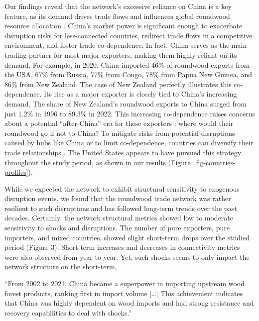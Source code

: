 \documentclass[
  authoryear,
  review,
  3p]{elsarticle}
\begin{document}
Our findings reveal that the network's excessive reliance on China is a
key feature, as its demand drives trade flows and influences global
roundwood resource allocation \citep{huang_static_2024}. China's market
power is significant enough to exacerbate disruption risks for
less-connected countries, redirect trade flows in a competitive
environment, and foster trade co-dependence. In fact, China serves as
the main trading partner for most major exporters, making them highly
reliant on its demand. For example, in 2020, China imported 46\% of
roundwood exports from the USA, 67\% from Russia, 77\% from Congo, 78\%
from Papua New Guinea, and 86\% from New Zealand. The case of New
Zealand perfectly illustrates this co-dependence. Its rise as a major
exporter is closely tied to China's increasing demand. The share of New
Zealand's roundwood exports to China surged from just 1.2\% in 1996 to
89.3\% in 2022. This increasing co-dependence raises concerns about a
potential ``after-China'' era for these exporters
\citep{villamor2024preparing}: where would their roundwood go if not to
China? To mitigate risks from potential disruptions caused by hubs like
China or to limit co-dependence, countries can diversify their trade
relationships \citep{huang_static_2024}. The United States appears to
have pursued this strategy throughout the study period, as shown in our
results (Figure~\ref{fig-countries-profiles}).

While we expected the network to exhibit structural sensitivity to
exogenous disruption events, we found that the roundwood trade network
was rather resilient to such disruptions and has followed long-term
trends over the past decades. Certainly, the network structural metrics
showed low to moderate sensitivity to shocks and disruptions. The number
of pure exporters, pure importers, and mixed countries, showed slight
short-term drops over the studied period (Figure 3). Short-term
increases and decreases in connectivity metrics were also observed from
year to year. Yet, such shocks seems to only impact the network
structure on the short-term,

``From 2002 to 2021, China became a superpower in importing upstream
wood forest products, ranking first in import volume {[}\ldots{]} This
achievement indicates that China was highly dependent on wood imports
and had strong resistance and recovery capabilities to deal with
shocks.''
\end{document}
